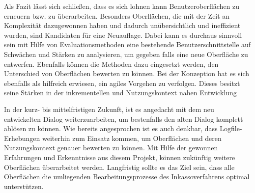 Als Fazit lässt sich schließen, dass es sich lohnen kann Benutzeroberflächen zu erneuern bzw. zu überarbeiten. Besonders Oberflächen, die mit der Zeit an Komplexität dazugewonnen haben und dadurch unübersichtlich und ineffizient wurden, sind Kandidaten für eine Neuauflage. Dabei kann es durchaus sinnvoll sein mit Hilfe von Evaluationsmethoden eine bestehende Benutzerschnittstelle auf Schwächen und Stärken zu analysieren, um gegeben falls eine neue Oberfläche zu entwerfen. Ebenfalls können die Methoden dazu eingesetzt werden, den Unterschied von Oberflächen bewerten zu können. Bei der Konzeption hat es sich ebenfalls als hilfreich erwiesen, ein agiles Vorgehen zu verfolgen. Dieses besitzt seine Stärken in der inkrementellen und  Nutzungskontext nahen Entwicklung 

In der kurz- bis mittelfristigen Zukunft, ist es angedacht mit dem neu entwickelten Dialog weiterzuarbeiten, um bestenfalls den alten Dialog komplett ablösen zu können. Wie bereits angesprochen ist es auch denkbar, dass Logfile-Erhebungen weiterhin zum Einsatz kommen, um Oberflächen und deren Nutzungskontext genauer bewerten zu können. Mit Hilfe der gewonnen Erfahrungen und Erkenntnisse aus diesem Projekt, können zukünftig weitere Oberflächen überarbeitet werden. Langfristig sollte es das Ziel sein, dass alle Oberflächen die umliegenden Bearbeitungsprozesse des Inkassoverfahrens optimal unterstützen.